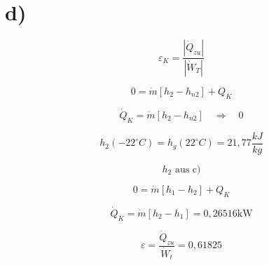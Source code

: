 

\section*{d)}

\[
\varepsilon_{K} = \frac{|\dot{Q}_{zu}|}{|\dot{W}_{T}|}
\]

\[
0 = \dot{m} [h_{2} - h_{n2}] + Q_{K}
\]

\[
\dot{Q}_{K} = \dot{m} [h_{2} - h_{n2}] \quad \Rightarrow \quad 0
\]

\[
h_{2} (-22^\circ C) = h_{g} (22^\circ C) = 21,77 \frac{kJ}{kg}
\]

\[
h_{2} \text{ aus c)}
\]

\[
0 = \dot{m} [h_{1} - h_{2}] + Q_{K}
\]

\[
\dot{Q}_{K} = \dot{m} [h_{2} - h_{1}] = 0,26516 \text{kW}
\]

\[
\varepsilon = \frac{\dot{Q}_{zu}}{\dot{W}_{t}} = 0,61825
\]